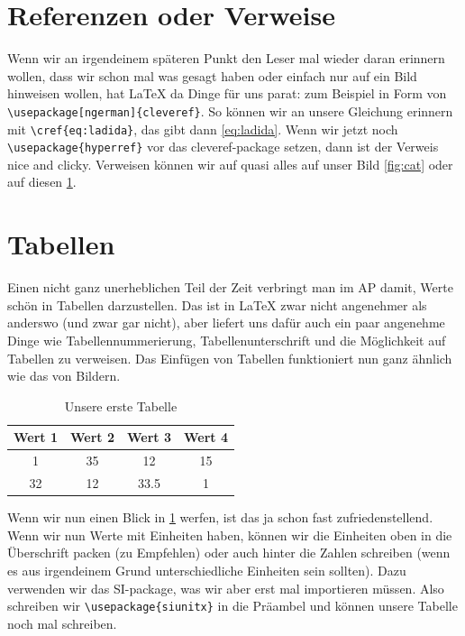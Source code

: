 \documentclass[a4paper]{article}
\begin{document}
\section{Referenzen oder Verweise}
\label{sec:referenzen_verweise}
Wenn wir an irgendeinem späteren Punkt den Leser mal wieder daran erinnern
wollen, dass wir schon mal was gesagt haben oder einfach nur auf ein Bild
hinweisen wollen, hat \LaTeX{} da Dinge für uns parat: zum Beispiel in
Form von \verb|\usepackage[ngerman]{cleveref}|.
So können wir an unsere Gleichung erinnern mit \verb|\cref{eq:ladida}|, das
gibt dann \cref{eq:ladida}.
Wenn wir jetzt noch  \verb|\usepackage{hyperref}| vor das cleveref-package
setzen, dann ist der Verweis nice and clicky.
Verweisen können wir auf quasi alles auf unser Bild \cref{fig:cat} oder auf
diesen \cref{sec:referenzen_verweise}.

\section{Tabellen}
Einen nicht ganz unerheblichen Teil der Zeit verbringt man im AP damit, Werte
schön in Tabellen darzustellen.
Das ist in \LaTeX{} zwar nicht angenehmer als anderswo (und zwar gar nicht),
aber liefert uns dafür auch ein paar angenehme Dinge wie Tabellennummerierung,
Tabellenunterschrift und die Möglichkeit auf Tabellen zu verweisen.
Das Einfügen von Tabellen funktioniert nun ganz ähnlich wie das von Bildern.

\begin{table}[htbp]
  \centering
  \begin{tabular}{c|c|c|c}
    Wert 1 & Wert 2 & Wert 3 & Wert 4 \\ \hline
    1      & 35     & 12     & 15 \\
    32     & 12     & 33.5   & 1 \\
  \end{tabular}
  \caption{Unsere erste Tabelle}%
  \label{tab:erste_tabelle}
\end{table}

Wenn wir nun einen Blick in \cref{tab:erste_tabelle} werfen, ist das ja schon
fast zufriedenstellend.
Wenn wir nun Werte mit Einheiten haben, können wir die Einheiten oben in die
Überschrift packen (zu Empfehlen) oder auch hinter die Zahlen schreiben (wenn
es aus irgendeinem Grund unterschiedliche Einheiten sein sollten).
Dazu verwenden wir das SI-package, was wir aber erst mal importieren müssen.
Also schreiben wir \verb|\usepackage{siunitx}| in die Präambel und können
unsere Tabelle noch mal schreiben.
\end{document}
